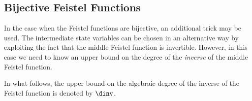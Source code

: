 
\subsection{Bijective Feistel Functions}

In the case when the Feistel functions are bijective, an additional trick may be used. The intermediate state variables can be chosen in an alternative way by exploiting the fact that the middle Feistel function is invertible. However, in this case we need to know an upper bound on the degree of the \emph{inverse} of the middle Feistel function.

In what follows, the upper bound on the algebraic degree of the inverse of the Feistel function is denoted by $\dinv$.

